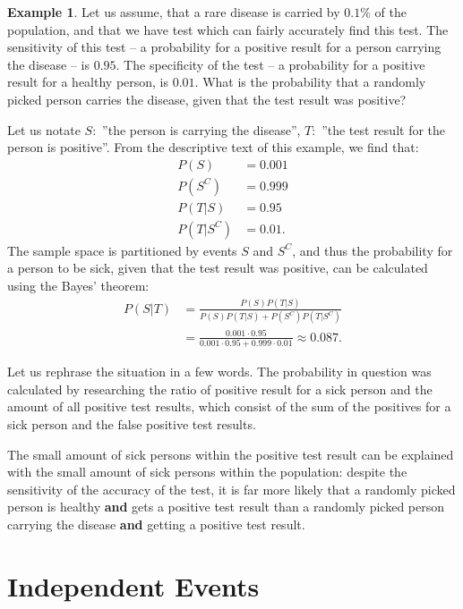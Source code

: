 \documentclass[12pt,a4paper,leqno]{report}
\theoremstyle{plain}
\theoremstyle{definition}
\newtheorem{esim}[equation]{Example}
\begin{document}
\begin{esim}
Let us assume, that a rare disease is carried by $0.1\%$ of the population, and that we have test which can fairly accurately find this test. The sensitivity of this test -- a probability for a positive result for a person carrying the disease -- is $0.95$. The specificity of the test -- a probability for a positive result for a healthy person, is $0.01$. What is the probability that a randomly picked person carries the disease, given that the test result was positive? 

Let us notate $S:$ ''the person is carrying the disease'', $T:$ ''the test result for the person is positive''. From the descriptive text of this example, we find that:
\[
\begin{split}
P(S) &= 0.001 \\
P(S^C) &= 0.999 \\
P(T|S) &= 0.95 \\
P(T|S^C) &= 0.01.
\end{split}
\]
The sample space is partitioned by events $S$ and $S^C$, and thus the probability for a person to be sick, given that the test result was positive, can be calculated using the Bayes' theorem:
\[
\begin{split}
P(S|T) &= \frac{P(S)P(T|S)}{P(S)P(T|S) + P(S^C)P(T|S^C)} \\
	   &= \frac{0.001 \cdot 0.95}{0.001 \cdot 0.95 + 0.999 \cdot 0.01} \approx 0.087.
\end{split}
\]

Let us rephrase the situation in a few words. The probability in question was calculated by researching the ratio of positive result for a sick person and the amount of all positive test results, which consist of the sum of the positives for a sick person and the false positive test results.

The small amount of sick persons within the positive test result can be explained with the small amount of sick persons within the population: despite the sensitivity of the accuracy of the test, it is far more likely that a randomly picked person is healthy \textbf{and} gets a positive test result than a randomly picked person carrying the disease \textbf{and} getting a positive test result.
\end{esim}

\section{Independent Events}\label{independence}
\end{document}
